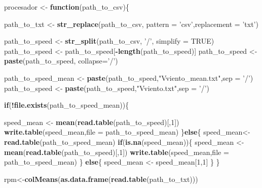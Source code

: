\documentclass[]{article}
\newenvironment{Shaded}{\begin{snugshade}}{\end{snugshade}}
\newcommand{\KeywordTok}[1]{\textcolor[rgb]{0.13,0.29,0.53}{\textbf{#1}}}
\newcommand{\DataTypeTok}[1]{\textcolor[rgb]{0.13,0.29,0.53}{#1}}
\newcommand{\DecValTok}[1]{\textcolor[rgb]{0.00,0.00,0.81}{#1}}
\newcommand{\StringTok}[1]{\textcolor[rgb]{0.31,0.60,0.02}{#1}}
\newcommand{\OtherTok}[1]{\textcolor[rgb]{0.56,0.35,0.01}{#1}}
\newcommand{\ControlFlowTok}[1]{\textcolor[rgb]{0.13,0.29,0.53}{\textbf{#1}}}
\newcommand{\OperatorTok}[1]{\textcolor[rgb]{0.81,0.36,0.00}{\textbf{#1}}}
\newcommand{\NormalTok}[1]{#1}
\begin{document}
\begin{Shaded}
\begin{Highlighting}[]
\NormalTok{procesador <-}\StringTok{ }\ControlFlowTok{function}\NormalTok{(path_to_csv)\{}
  
\NormalTok{  path_to_txt <-}\StringTok{ }\KeywordTok{str_replace}\NormalTok{(path_to_csv, }\DataTypeTok{pattern =} \StringTok{'csv'}\NormalTok{,}\DataTypeTok{replacement =} \StringTok{'txt'}\NormalTok{)}
  
\NormalTok{  path_to_speed <-}\StringTok{ }\KeywordTok{str_split}\NormalTok{(path_to_csv, }\StringTok{'/'}\NormalTok{, }\DataTypeTok{simplify =} \OtherTok{TRUE}\NormalTok{)}
\NormalTok{  path_to_speed <-}\StringTok{ }\NormalTok{path_to_speed[}\OperatorTok{-}\KeywordTok{length}\NormalTok{(path_to_speed)]}
\NormalTok{  path_to_speed <-}\StringTok{ }\KeywordTok{paste}\NormalTok{(path_to_speed, }\DataTypeTok{collapse=}\StringTok{'/'}\NormalTok{)}
  
\NormalTok{  path_to_speed_mean <-}\StringTok{ }\KeywordTok{paste}\NormalTok{(path_to_speed,}\StringTok{"Vviento_mean.txt"}\NormalTok{,}\DataTypeTok{sep =} \StringTok{'/'}\NormalTok{)}
\NormalTok{  path_to_speed <-}\StringTok{ }\KeywordTok{paste}\NormalTok{(path_to_speed,}\StringTok{"Vviento.txt"}\NormalTok{,}\DataTypeTok{sep =} \StringTok{'/'}\NormalTok{)}
  
  \ControlFlowTok{if}\NormalTok{(}\OperatorTok{!}\KeywordTok{file.exists}\NormalTok{(path_to_speed_mean))\{}
    
\NormalTok{    speed_mean <-}\StringTok{ }\KeywordTok{mean}\NormalTok{(}\KeywordTok{read.table}\NormalTok{(path_to_speed)[,}\DecValTok{1}\NormalTok{])}
    \KeywordTok{write.table}\NormalTok{(speed_mean,}\DataTypeTok{file =}\NormalTok{ path_to_speed_mean)}
\NormalTok{  \}}\ControlFlowTok{else}\NormalTok{\{}
\NormalTok{    speed_mean<-}\StringTok{ }\KeywordTok{read.table}\NormalTok{(path_to_speed_mean)}
    \ControlFlowTok{if}\NormalTok{(}\KeywordTok{is.na}\NormalTok{(speed_mean))\{}
\NormalTok{      speed_mean <-}\StringTok{ }\KeywordTok{mean}\NormalTok{(}\KeywordTok{read.table}\NormalTok{(path_to_speed)[,}\DecValTok{1}\NormalTok{])}
      \KeywordTok{write.table}\NormalTok{(speed_mean,}\DataTypeTok{file =}\NormalTok{ path_to_speed_mean) }
\NormalTok{    \} }\ControlFlowTok{else}\NormalTok{\{}
\NormalTok{      speed_mean <-}\StringTok{ }\NormalTok{speed_mean[}\DecValTok{1}\NormalTok{,}\DecValTok{1}\NormalTok{]}
\NormalTok{    \}}
\NormalTok{  \}}
  
  
  
\NormalTok{  rpm<-}\KeywordTok{colMeans}\NormalTok{(}\KeywordTok{as.data.frame}\NormalTok{(}\KeywordTok{read.table}\NormalTok{(path_to_txt)))}
  

\end{Highlighting}
\end{Shaded}
\end{document}
